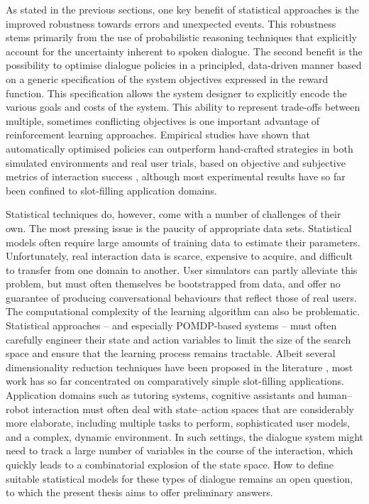 
As stated in the previous sections, one key benefit of statistical approaches is the improved robustness towards errors and unexpected events. This robustness stems primarily from the use of probabilistic reasoning techniques that explicitly account for the uncertainty inherent to spoken dialogue.  The second benefit is the possibility to optimise dialogue policies in a principled, data-driven manner based on a generic specification of the system objectives expressed in the reward function.  This specification allows the system designer to explicitly encode the various goals and costs of the system. This ability to represent trade-offs between multiple, sometimes conflicting objectives is one important advantage of reinforcement learning approaches.  Empirical studies have shown that automatically optimised policies can outperform hand-crafted strategies in both simulated environments and real user trials, based on objective and subjective metrics of interaction success \citep{Supelec270,6407655}, although most experimental results have so far been confined to slot-filling application domains. 

Statistical techniques do, however, come with a number of challenges of their own. The most pressing issue is the paucity of appropriate data sets.  Statistical models often require large amounts of training data to estimate their parameters. Unfortunately, real interaction data is scarce, expensive to acquire, and difficult to transfer from one domain to another.  User simulators can partly alleviate this problem, but must often themselves be bootstrapped from data, and offer no guarantee of producing conversational behaviours that reflect those of real users.  The computational complexity of the learning algorithm can also be problematic. Statistical approaches -- and especially POMDP-based systems -- must often carefully engineer their state and action variables to limit the size of the search space and ensure that the learning process remains tractable.  Albeit several dimensionality reduction techniques have been proposed in the literature \citep{williams2005,Young:2010,Cuayahuitl:2010,CrookL11}, most work has so far concentrated on comparatively simple slot-filling applications.  Application domains such as tutoring systems, cognitive assistants and human--robot interaction must often deal with state--action spaces that are considerably more elaborate, including multiple tasks to perform, sophisticated user models, and a complex, dynamic environment.  In such settings, the dialogue system might need to track a large number of variables in the course of the interaction, which quickly leads to a combinatorial explosion of the state space.  How to define suitable statistical models for these types of dialogue remains an open question, to which the present thesis aims to offer preliminary answers. 

